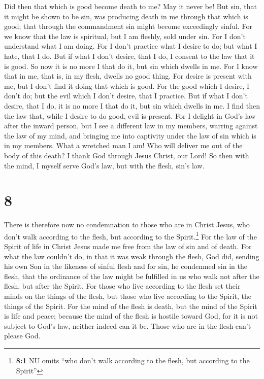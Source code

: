  Did then that which is good become death to me? May it
never be! But sin, that it might be shown to be sin, was producing death
in me through that which is good; that through the commandment sin might
become exceedingly sinful.  For we know that the law is
spiritual, but I am fleshly, sold under sin.  For I don't
understand what I am doing. For I don't practice what I desire to do;
but what I hate, that I do.  But if what I don't desire,
that I do, I consent to the law that it is good.  So now
it is no more I that do it, but sin which dwells in me. 
For I know that in me, that is, in my flesh, dwells no good thing. For
desire is present with me, but I don't find it doing that which is good.
 For the good which I desire, I don't do; but the evil
which I don't desire, that I practice.  But if what I
don't desire, that I do, it is no more I that do it, but sin which
dwells in me.  I find then the law that, while I desire
to do good, evil is present.  For I delight in God's law
after the inward person,  but I see a different law in my
members, warring against the law of my mind, and bringing me into
captivity under the law of sin which is in my members. 
What a wretched man I am! Who will deliver me out of the body of this
death?  I thank God through Jesus Christ, our Lord! So
then with the mind, I myself serve God's law, but with the flesh, sin's
law.

\hypertarget{section-7}{%
\section{8}\label{section-7}}

 There is therefore now no condemnation to those who are
in Christ Jesus, who don't walk according to the flesh, but according to
the Spirit.\footnote{\textbf{8:1} NU omits ``who don't walk according to
  the flesh, but according to the Spirit''}  For the law
of the Spirit of life in Christ Jesus made me free from the law of sin
and of death.  For what the law couldn't do, in that it
was weak through the flesh, God did, sending his own Son in the likeness
of sinful flesh and for sin, he condemned sin in the flesh,
 that the ordinance of the law might be fulfilled in us
who walk not after the flesh, but after the Spirit.  For
those who live according to the flesh set their minds on the things of
the flesh, but those who live according to the Spirit, the things of the
Spirit.  For the mind of the flesh is death, but the mind
of the Spirit is life and peace;  because the mind of the
flesh is hostile toward God, for it is not subject to God's law, neither
indeed can it be.  Those who are in the flesh can't please
God.

